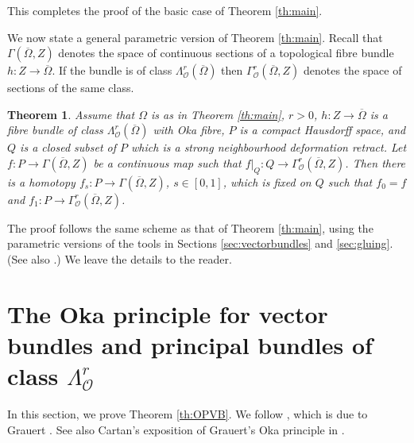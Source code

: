 \documentclass[11pt]{amsart}
\numberwithin{equation}{section}
\newtheorem{theorem}{Theorem}[section]
\theoremstyle{definition}
\newcommand\Oscr{\mathscr{O}}
\begin{document}
This completes the proof of the basic case of Theorem \ref{th:main}.

%
%
We now state a general parametric version of Theorem \ref{th:main}.
Recall that $\Gamma(\overline \Omega,Z)$ denotes the space of
continuous sections of a topological fibre bundle $h:Z\to \overline \Omega$. 
If the bundle is of class $\Lambda^r_\Oscr(\overline \Omega)$ then 
$\Gamma^r_\Oscr(\overline \Omega,Z)$ denotes the space of
sections of the same class.

\begin{theorem}\label{th:mainpar}
Assume that $\Omega$ is as in Theorem \ref{th:main},
$r>0$, $h:Z\to \overline \Omega$ is a fibre bundle of class 
$\Lambda^r_\Oscr(\overline \Omega)$ with Oka fibre, 
$P$ is a compact Hausdorff space, and $Q$ is a closed subset 
of $P$ which is a strong neighbourhood deformation retract.
Let $f:P\to \Gamma(\overline \Omega,Z)$ be a continuous map
such that $f|_Q:Q\to \Gamma^r_\Oscr(\overline \Omega,Z)$.
Then there is a homotopy 
$f_s:P\to \Gamma(\overline \Omega,Z)$, $s\in [0,1]$,
which is fixed on $Q$ such that $f_0=f$ and 
$f_1:P\to  \Gamma^r_\Oscr(\overline \Omega,Z)$.
\end{theorem}

The proof follows the same scheme as that of Theorem \ref{th:main},  
using the parametric versions of the tools 
in Sections \ref{sec:vectorbundles} and \ref{sec:gluing}.
(See also \cite[Sect.\ 5.13]{Forstneric2017E}.) 
We leave the details to the reader.

%
%
%
%
\section{The Oka principle for vector bundles and principal
bundles of class $\Lambda^r_\Oscr$}
\label{sec:OPVB}

In this section, we prove Theorem \ref{th:OPVB}.
We follow \cite[proof of Theorem 5.3.1]{Forstneric2017E},
which is due to Grauert \cite{Grauert1958MA}. 
See also Cartan's exposition of Grauert's Oka principle in \cite{Cartan1958}.
\end{document}
